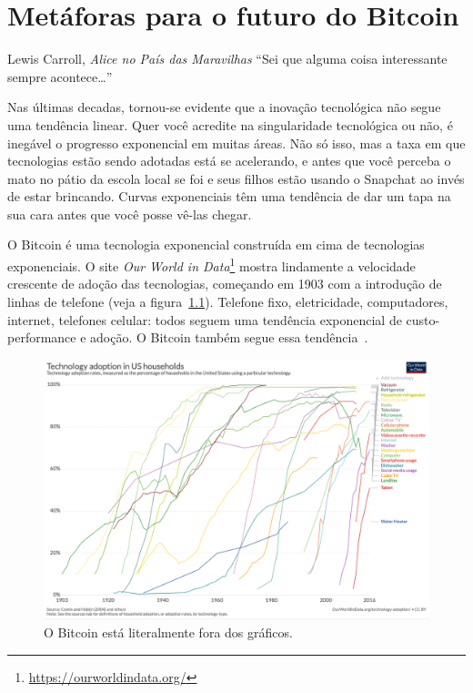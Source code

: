 \chapter{Metáforas para o futuro do Bitcoin}
\label{les:21}

\begin{chapquote}{Lewis Carroll, \textit{Alice no País das Maravilhas}}
\enquote{Sei que alguma coisa interessante sempre acontece\ldots}
\end{chapquote}

Nas últimas decadas, tornou-se evidente que a inovação tecnológica não segue uma tendência linear. Quer você acredite na singularidade tecnológica ou não, é inegável o progresso exponencial em muitas áreas. Não só isso, mas a taxa em que tecnologias estão sendo adotadas está se acelerando, e antes que você perceba o mato no pátio da escola local se foi e seus filhos estão usando o Snapchat ao invés de estar brincando. Curvas exponenciais têm uma tendência de dar um tapa na sua cara antes que você posse vê-las chegar.

O Bitcoin é uma tecnologia exponencial construída em cima de tecnologias exponenciais.
O site \textit{Our World in Data}\footnote{\url{https://ourworldindata.org/}}
mostra lindamente a velocidade crescente de adoção das tecnologias, começando em 1903
com a introdução de linhas de telefone (veja a figura~\ref{fig:tech-adoption}). Telefone fixo, eletricidade, computadores, internet, telefones celular: todos seguem uma tendência exponencial de custo-performance e adoção. O Bitcoin também segue essa tendência~\cite{tech-adoption}.

\begin{figure}
  \includegraphics{assets/images/tech-adoption.png}
  \caption{O Bitcoin está literalmente fora dos gráficos.}
  \label{fig:tech-adoption}
\end{figure}

